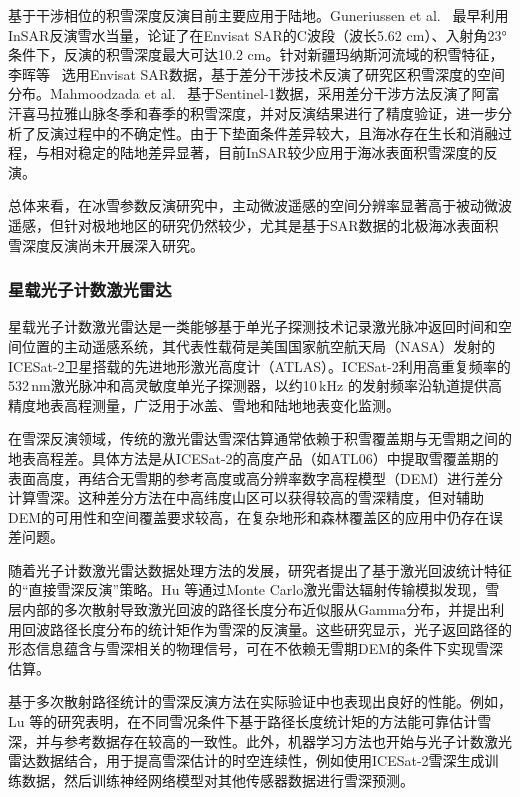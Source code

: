 基于干涉相位的积雪深度反演目前主要应用于陆地。Guneriussen et al.~\cite{guneriussen2001} 最早利用InSAR反演雪水当量，论证了在Envisat SAR的C波段（波长5.62 cm）、入射角23°条件下，反演的积雪深度最大可达10.2 cm。针对新疆玛纳斯河流域的积雪特征，李晖等~\cite{lihui2014} 选用Envisat SAR数据，基于差分干涉技术反演了研究区积雪深度的空间分布。Mahmoodzada et al.~\cite{mahmoodzada2020} 基于Sentinel-1数据，采用差分干涉方法反演了阿富汗喜马拉雅山脉冬季和春季的积雪深度，并对反演结果进行了精度验证，进一步分析了反演过程中的不确定性。由于下垫面条件差异较大，且海冰存在生长和消融过程，与相对稳定的陆地差异显著，目前InSAR较少应用于海冰表面积雪深度的反演。

总体来看，在冰雪参数反演研究中，主动微波遥感的空间分辨率显著高于被动微波遥感，但针对极地地区的研究仍然较少，尤其是基于SAR数据的北极海冰表面积雪深度反演尚未开展深入研究。

\subsubsection{星载光子计数激光雷达}

星载光子计数激光雷达是一类能够基于单光子探测技术记录激光脉冲返回时间和空间位置的主动遥感系统，其代表性载荷是美国国家航空航天局（NASA）发射的ICESat-2卫星搭载的先进地形激光高度计（ATLAS）\citep{ICESat2_GSFC}。ICESat-2利用高重复频率的532\,nm激光脉冲和高灵敏度单光子探测器，以约10\,kHz 的发射频率沿轨道提供高精度地表高程测量，广泛用于冰盖、雪地和陆地地表变化监测。

在雪深反演领域，传统的激光雷达雪深估算通常依赖于积雪覆盖期与无雪期之间的地表高程差。具体方法是从ICESat-2的高度产品（如ATL06）中提取雪覆盖期的表面高度，再结合无雪期的参考高度或高分辨率数字高程模型（DEM）进行差分计算雪深\citep{DeschampsBerger2023_SnowDepth_ICESat2}。这种差分方法在中高纬度山区可以获得较高的雪深精度，但对辅助DEM的可用性和空间覆盖要求较高，在复杂地形和森林覆盖区的应用中仍存在误差问题\citep{DeschampsBerger2023_SnowDepth_ICESat2}。

随着光子计数激光雷达数据处理方法的发展，研究者提出了基于激光回波统计特征的“直接雪深反演”策略。Hu 等通过Monte Carlo激光雷达辐射传输模拟发现，雪层内部的多次散射导致激光回波的路径长度分布近似服从Gamma分布，并提出利用回波路径长度分布的统计矩作为雪深的反演量\citep{Lu2022_DerivingSnowDepth,sunmack2025_NeuralNetworkBased}。这些研究显示，光子返回路径的形态信息蕴含与雪深相关的物理信号，可在不依赖无雪期DEM的条件下实现雪深估算\citep{Lu2022_DerivingSnowDepth}。

基于多次散射路径统计的雪深反演方法在实际验证中也表现出良好的性能。例如，Lu 等的研究表明，在不同雪况条件下基于路径长度统计矩的方法能可靠估计雪深，并与参考数据存在较高的一致性\citep{Lu2022_DerivingSnowDepth}。此外，机器学习方法也开始与光子计数激光雷达数据结合，用于提高雪深估计的时空连续性，例如使用ICESat-2雪深生成训练数据，然后训练神经网络模型对其他传感器数据进行雪深预测\citep{sunmack2025_NeuralNetworkBased}。

